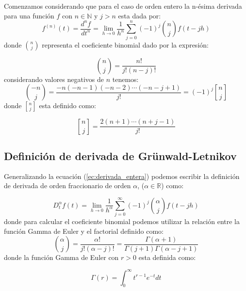 \documentclass[10pt,a4paper]{article}
\newcommand{\binomb}[2]{\genfrac{[}{]}{0pt}{}{#1}{#2}}
\begin{document}
	Comenzamos considerando que para el caso de orden entero la n-ésima derivada para una función $f$ con $n \in \mathbb{N}$ y $j>n$ esta dada por:
	\begin{equation}
		f^{(n)}(t) = \frac{d^{n}f}{dt^{n}} = \lim_{h \to 0 } \frac{1}{h^{n}} \sum_{j = 0}^{n} (-1)^{j} \binom{n}{j} f(t - jh)
		\label{ec:derivada_entera}
	\end{equation}
	donde $\binom{n}{j}$ representa el coeficiente binomial dado por la expresión:
			
	\begin{equation}
		\binom{n}{j} = \frac{n!}{j! (n-j)! } 
	\end{equation}
	considerando valores negativos de $n$ tenemos:
	\begin{equation}
		\binom{-n}{j} = \frac{-n(-n-1)(-n-2) \cdots (-n -j +1 )}{j!}= (-1)^{j} \binomb{n}{j}
		\label{ec:binomio_n}
	\end{equation}
	donde $\binomb{n}{j}$ esta definido como:
			
	\begin{equation}
		\binomb{n}{j} = \frac{2(n+1) \cdots (n+j-1)}{j!}
	\end{equation}
	
		\subsection{Definición de derivada de Grünwald-Letnikov}
		
	Generalizando la ecuación (\ref{ec:derivada_entera}) podemos escribir la definición de derivada de orden fraccionario de orden  $\alpha$, ($\alpha \in \mathbb{R}$) como:
		
	\begin{equation}
		D^{\alpha}_{t} f(t) = \lim_{h \to 0} \frac{1}{h^{\alpha}}   \sum_{j = 0}^{\infty} (-1)^{j} \binom{\alpha}{j} f(t - jh)
		\label{ec:derivada_frac_GL}
	\end{equation}
	donde para calcular el coeficiente binomial podemos utilizar la relación entre la función Gamma de Euler y el factorial definido como:
	\begin{equation}
		\binom{\alpha}{j}  = \frac{\alpha!}{j! (\alpha-j)!} = \frac{\Gamma (\alpha + 1)}{\Gamma(j+1) \Gamma(\alpha - j + 1)}
	\end{equation}
	donde la función Gamma de Euler con $r>0$ esta definida como:
			
	\begin{equation}
		\Gamma(r) = \int^{\infty}_{0} t^{r-1} e^{-t}dt
	\end{equation}
			
\end{document}
